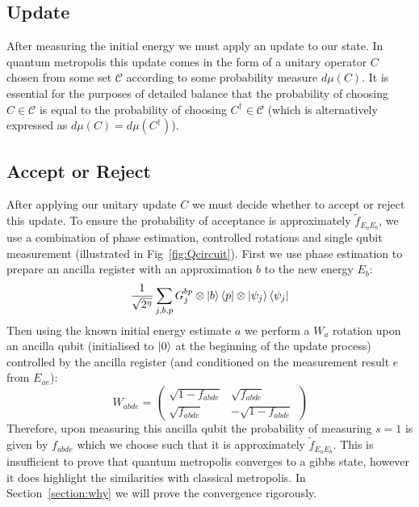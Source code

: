 \documentclass[aps,floatfix,10pt,amssymb,amsfont,amsmath,superscriptaddress,float,nofootinbib,longbibliography,nobalancelastpage,twocolumn]{revtex4-2}
\begin{document}
\subsection{Update}
\label{section:update}
After measuring the initial energy we must apply an update to our state. In quantum metropolis this update comes in the form of a unitary operator $C$ chosen from some set $\mathcal{C}$ according to some probability measure $d\mu(C)$. It is essential for the purposes of detailed balance that the probability of choosing $C \in \mathcal{C}$ is equal to the probability of choosing $C^{\dagger} \in \mathcal{C}$ (which is alternatively expressed as $d\mu(C) = d\mu(C^{\dagger})$).
\subsection{Accept or Reject}
\label{section:acceptprob}
After applying our unitary update $C$ we must decide whether to accept or reject this update. To ensure the probability of acceptance is approximately $\tilde{f}_{E_aE_b}$, we use a combination of phase estimation, controlled rotations and single qubit measurement (illustrated in Fig~\ref{fig:Qcircuit}). First we use phase estimation to prepare an ancilla register with an approximation $b$ to the new energy $E_b$:
\begin{equation}
   \frac{1}{\sqrt{2^{\eta}}}\sum_{j,b,p}G_j^{bp}\otimes\ket{b}\bra{p}\otimes\ket{\psi_j}\bra{\psi_j}
\end{equation}
Then using the known initial energy estimate $a$ we perform a $W_{a}$ rotation upon an ancilla qubit (initialised to $\ket{0}$ at the beginning of the update process) controlled by the ancilla register (and conditioned on the measurement result $e$ from $E_{ae}$):
\begin{equation}
    W_{abde} = \begin{pmatrix}
        \sqrt{1 - f_{abde}} & \sqrt{f_{abde}}\\
       \sqrt{f_{abde}} & -\sqrt{1 - f_{abde}}
    \end{pmatrix}
\end{equation}
Therefore, upon measuring this ancilla qubit the probability of measuring $s=1$ is given by $f_{abde}$ which we choose such that it is approximately $\tilde f_{E_aE_b}$. This is insufficient to prove that quantum metropolis converges to a gibbs state, however it does highlight the similarities with classical metropolis. In Section~\ref{section:why} we will prove the convergence rigorously.
\end{document}
